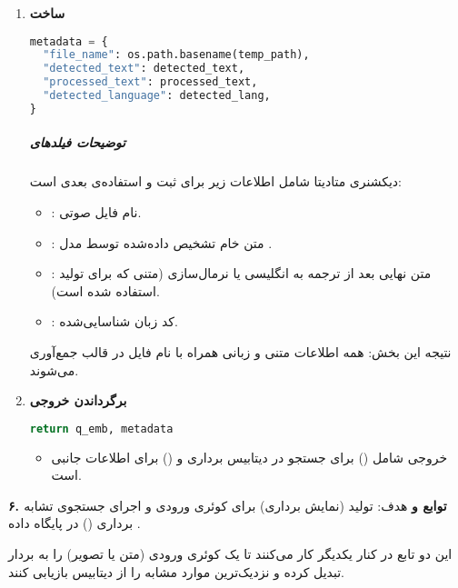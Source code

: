 \documentclass{article}
\begin{document}
\begin{enumerate}
    \item \textbf{ساخت }
        \begin{latin}
        \begin{lstlisting}[language=Python]
metadata = {
  "file_name": os.path.basename(temp_path),
  "detected_text": detected_text,
  "processed_text": processed_text,
  "detected_language": detected_lang,
}
        \end{lstlisting}
        \end{latin}
        
        \subparagraph{توضیحات فیلدهای }
        دیکشنری متادیتا شامل اطلاعات زیر برای ثبت و استفاده‌ی بعدی است:
        \begin{itemize}
            \item {}: نام فایل صوتی.
            \item {}: متن خام تشخیص داده‌شده توسط مدل .
            \item {}: متن نهایی بعد از ترجمه به انگلیسی یا نرمال‌سازی (متنی که برای تولید  استفاده شده است).
            \item {}: کد زبان شناسایی‌شده.
        \end{itemize}
        
        نتیجه این بخش: همه اطلاعات متنی و زبانی همراه با نام فایل در قالب  جمع‌آوری می‌شوند.

    \item \textbf{برگرداندن خروجی}
        \begin{latin}
        \begin{lstlisting}[language=Python]
return q_emb, metadata
        \end{lstlisting}
        \end{latin}
        \begin{itemize}
            \item خروجی شامل  () برای جستجو در دیتابیس برداری و  () برای اطلاعات جانبی است.
        \end{itemize}
\end{enumerate}


\textbf{۶. توابع  و }
هدف: تولید  (نمایش برداری) برای کوئری ورودی و اجرای جستجوی تشابه برداری () در پایگاه داده .

این دو تابع در کنار یکدیگر کار می‌کنند تا یک کوئری ورودی (متن یا تصویر) را به بردار تبدیل کرده و نزدیک‌ترین موارد مشابه را از دیتابیس بازیابی کنند.
\end{document}
